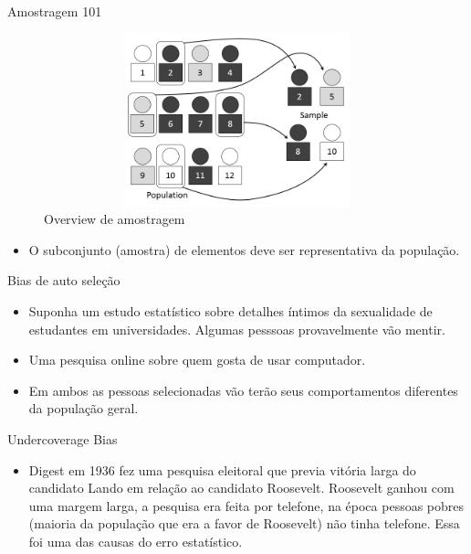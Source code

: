 \begin{frame}	
	\begin{block}{Amostragem 101}	
		\begin{figure}[!htb]
			\centering	  				
			\includegraphics[height=5cm, width = 12cm]{./pic/sampling.png}
			\caption{Overview de amostragem}
			\label{fig_sampling}
		\end{figure}
		\begin{itemize} 
			\item O subconjunto (amostra) de elementos deve ser representativa da população.
		\end{itemize}
	\end{block}
\end{frame}

\begin{frame}	
	\begin{block}{Bias de auto seleção}	
		\begin{itemize} 
			\item Suponha um estudo estatístico sobre detalhes íntimos da sexualidade de estudantes em universidades. Algumas pesssoas provavelmente vão mentir.
			\item Uma pesquisa online sobre quem gosta de usar computador.
			\item Em ambos as pessoas selecionadas vão terão seus comportamentos diferentes da população geral.
		\end{itemize}
	\end{block}
\end{frame}


\begin{frame}	
	\begin{block}{Undercoverage Bias}	
		\begin{itemize} 
			\item Digest em 1936 fez uma pesquisa eleitoral que previa vitória larga do candidato Lando em relação ao candidato Roosevelt. Roosevelt ganhou com uma margem larga, a pesquisa era feita por telefone, na época pessoas pobres (maioria da população que era a favor de Roosevelt) não tinha telefone. Essa foi uma das causas do erro estatístico.
		\end{itemize}
	\end{block}
\end{frame}

